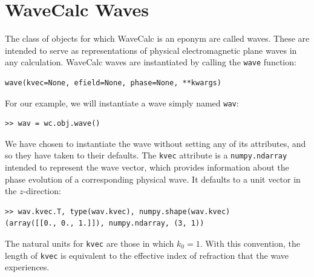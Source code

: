 \documentclass[11pt, reqno]{book}%
\newcounter{ct}
\newcommand{\tw}[1]{{\tt #1}}
\begin{document}

\section{WaveCalc Waves}
\label{sec:wcwaves}

The class of objects for which WaveCalc is an eponym are called waves. These are intended to serve as representations of physical electromagnetic plane waves in any calculation. WaveCalc waves are instantiated by calling the \tw{wave} function:
\begin{verbatim}
wave(kvec=None, efield=None, phase=None, **kwargs)
\end{verbatim}
\noindent For our example, we will instantiate a wave simply named \tw{wav}:
\begin{verbatim}
>> wav = wc.obj.wave()
\end{verbatim}
\noindent We have chosen to instantiate the wave without setting any of its attributes, and so they have taken to their defaults. The \tw{kvec} attribute is a \tw{numpy.ndarray} intended to represent the wave vector, which provides information about the phase evolution of a corresponding physical wave. It defaults to a unit vector in the $z$-direction:
\begin{verbatim}
>> wav.kvec.T, type(wav.kvec), numpy.shape(wav.kvec)
(array([[0., 0., 1.]]), numpy.ndarray, (3, 1))
\end{verbatim}
\noindent The natural units for \tw{kvec} are those in which $k_0=1$. With this convention, the length of \tw{kvec} is equivalent to the effective index of refraction that the wave experiences.
\end{document}
